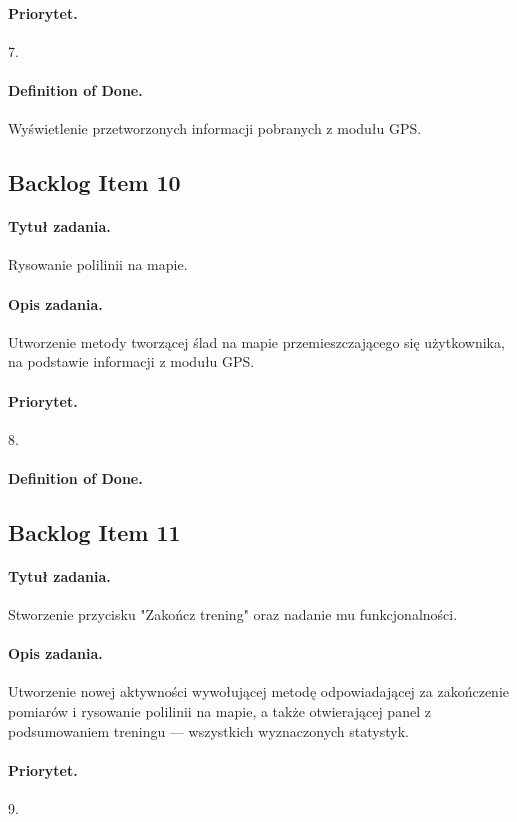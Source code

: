 \documentclass[a4paper]{article}
\begin{document}
\paragraph{Priorytet.} 7.
\paragraph{Definition of Done.} Wyświetlenie przetworzonych informacji pobranych z modułu GPS.

\subsection{Backlog Item 10}
\paragraph{Tytuł zadania.} Rysowanie polilinii na mapie.
\paragraph{Opis zadania.} Utworzenie metody tworzącej ślad na mapie przemieszczającego się użytkownika, na podstawie informacji z modułu GPS.
\paragraph{Priorytet.} 8.
\paragraph{Definition of Done.}

\subsection{Backlog Item 11}
\paragraph{Tytuł zadania.} Stworzenie przycisku "Zakończ trening" oraz nadanie mu funkcjonalności.
\paragraph{Opis zadania.} Utworzenie nowej aktywności wywołującej metodę odpowiadającej za zakończenie pomiarów i rysowanie polilinii na mapie, a także otwierającej panel z podsumowaniem treningu --- wszystkich wyznaczonych statystyk.
\paragraph{Priorytet.} 9.
\end{document}
